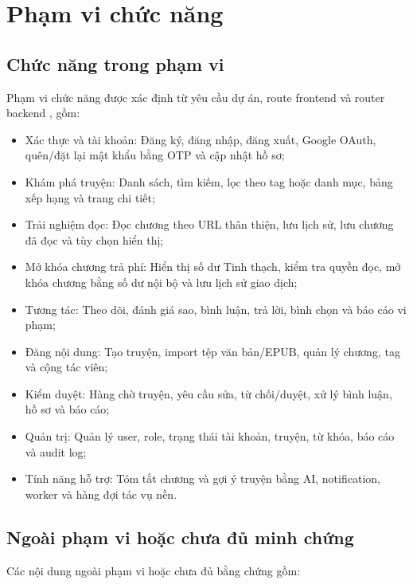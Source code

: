\section{Phạm vi chức năng}

\subsection{Chức năng trong phạm vi}

Phạm vi chức năng được xác định từ yêu cầu dự án, route frontend và router backend \cite{requirements}, gồm:

\begin{itemize}[leftmargin=4.5em, label=--, labelsep=0.6em]
  \item Xác thực và tài khoản: Đăng ký, đăng nhập, đăng xuất, Google OAuth, quên/đặt lại mật khẩu bằng OTP và cập nhật hồ sơ;
  \item Khám phá truyện: Danh sách, tìm kiếm, lọc theo tag hoặc danh mục, bảng xếp hạng và trang chi tiết;
  \item Trải nghiệm đọc: Đọc chương theo URL thân thiện, lưu lịch sử, lưu chương đã đọc và tùy chọn hiển thị;
  \item Mở khóa chương trả phí: Hiển thị số dư Tinh thạch, kiểm tra quyền đọc, mở khóa chương bằng số dư nội bộ và lưu lịch sử giao dịch;
  \item Tương tác: Theo dõi, đánh giá sao, bình luận, trả lời, bình chọn và báo cáo vi phạm;
  \item Đăng nội dung: Tạo truyện, import tệp văn bản/EPUB, quản lý chương, tag và cộng tác viên;
  \item Kiểm duyệt: Hàng chờ truyện, yêu cầu sửa, từ chối/duyệt, xử lý bình luận, hồ sơ và báo cáo;
  \item Quản trị: Quản lý user, role, trạng thái tài khoản, truyện, từ khóa, báo cáo và audit log;
  \item Tính năng hỗ trợ: Tóm tắt chương và gợi ý truyện bằng AI, notification, worker và hàng đợi tác vụ nền.
\end{itemize}

\clearpage
\subsection{Ngoài phạm vi hoặc chưa đủ minh chứng}

Các nội dung ngoài phạm vi hoặc chưa đủ bằng chứng gồm:

